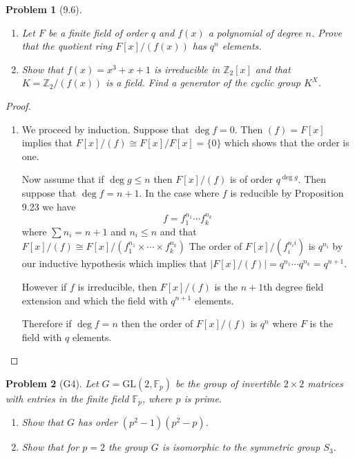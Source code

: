 \documentclass[10pt]{article}
\newcommand{\sk}{\vskip 10mm}
\newcommand{\bb}[1]{\mathbb{#1}}
\theoremstyle{plain}
\newtheorem{problem}{Problem}
\theoremstyle{remark}
\begin{document}
\sk


\begin{problem}[9.6]
  \begin{enumerate}
  \item Let $F$ be a finite field of order $q$ and $f(x)$ a polynomial of degree
    $n$. Prove that the quotient ring $F[x]/(f(x))$ has $q^n$ elements.
  \item Show that $f(x)=x^3+x+1$ is irreducible in $\bb{Z}_2[x]$ and that
    $K=\bb{Z}_2/(f(x))$ is a field. Find a generator of the cyclic group
    $K^X$.
  \end{enumerate}
\end{problem}

\begin{proof}
  \begin{enumerate}
  \item We proceed by induction. Suppose that $\deg f=0$. Then $(f)=F[x]$
    implies that $F[x]/(f)\cong F[x]/F[x]=\{0\}$ which shows that the order is one.

    Now assume that if $\deg g \leq n$ then $F[x]/(f)$ is of order $q^{\deg g}$.
    Then suppose that $\deg f = n+1$. In the case where $f$ is reducible
    by Proposition 9.23 we have
    \[ f=f_1^{n_1}\cdots f_k^{n_k} \]
    where $\sum n_i=n+1$ and $n_i\leq n$ and that
    $F[x]/(f) \cong F[x]/(f_1^{n_1}\times\cdots\times f_k^{n_k})$
    The order of $F[x]/(f_i^{n_ii})$ is $q^{n_i}$ by our inductive hypothesis
    which implies that $|F[x]/(f)|=q^{n_1}\cdots q^{n_k}=q^{n+1}$.

    However if $f$ is irreducible, then $F[x]/(f)$ is the $n+1$th degree
    field extension and which the field with $q^{n+1}$ elements.

    Therefore if $\deg f=n$ then the order of $F[x]/(f)$ is $q^n$ where
    $F$ is the field with $q$ elements.
  \end{enumerate}
\end{proof}

\sk


\begin{problem}[G4]
  Let $G=\text{GL}(2,\bb{F}_p)$ be the group of invertible $2\times 2$ matrices
  with entries in the finite field $\bb{F}_p$, where $p$ is prime.
  \begin{enumerate}
  \item Show that $G$ has order $(p^2-1)(p^2-p)$.
  \item Show that for $p=2$ the group $G$ is isomorphic to the symmetric group
    $S_3$.
  \end{enumerate}
\end{problem}
\end{document}
